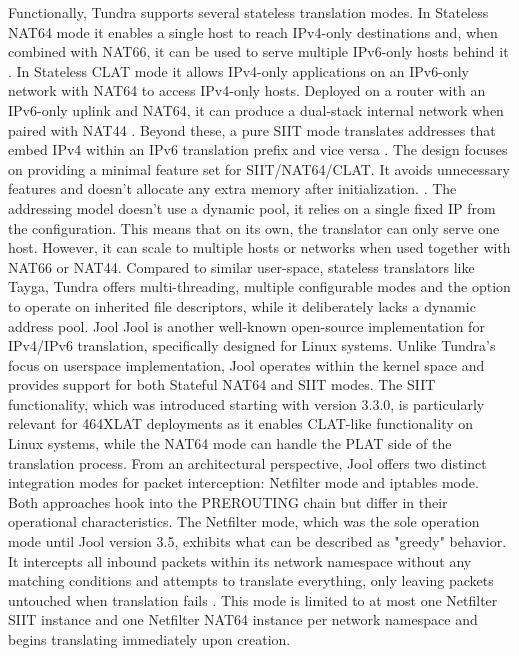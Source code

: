 Functionally, Tundra supports several stateless translation modes. In Stateless NAT64 mode it enables a single host to reach IPv4-only destinations and, when combined with NAT66, it can be used to serve multiple IPv6-only hosts behind it \cite{labuda_tundra_nat64}. In Stateless CLAT mode it allows IPv4-only applications on an IPv6-only network with NAT64 to access IPv4-only hosts. Deployed on a router with an IPv6-only uplink and NAT64, it can produce a dual-stack internal network when paired with NAT44 \cite{labuda_tundra_nat64}. Beyond these, a pure SIIT mode translates addresses that embed IPv4 within an IPv6 translation prefix and vice versa \cite{labuda_tundra_nat64}. 
The design focuses on providing a minimal feature set for SIIT/NAT64/CLAT. It avoids unnecessary features and doesn’t allocate any extra memory after initialization. \cite{labuda_tundra_nat64}. The addressing model doesn’t use a dynamic pool, it relies on a single fixed IP from the configuration. This means that on its own, the translator can only serve one host. However, it can scale to multiple hosts or networks when used together with NAT66 or NAT44\cite{labuda_tundra_nat64}.
Compared to similar user-space, stateless translators like Tayga, Tundra offers multi-threading, multiple configurable modes and the option to operate on inherited file descriptors, while it deliberately lacks a dynamic address pool\cite{labuda_tundra_nat64}. 
Jool
Jool is another well-known open-source implementation for IPv4/IPv6 translation, specifically designed for Linux systems\cite{jool_introduction}. Unlike Tundra's focus on userspace implementation, Jool operates within the kernel space and provides support for both Stateful NAT64 and SIIT modes. The SIIT functionality, which was introduced starting with version 3.3.0, is particularly relevant for 464XLAT deployments as it enables CLAT-like functionality on Linux systems, while the NAT64 mode can handle the PLAT side of the translation process\cite{jool_introduction}.
From an architectural perspective, Jool offers two distinct integration modes for packet interception: Netfilter mode and iptables mode. Both approaches hook into the PREROUTING chain but differ in their operational characteristics\cite{jool_introduction}. The Netfilter mode, which was the sole operation mode until Jool version 3.5, exhibits what can be described as "greedy" behavior. It intercepts all inbound packets within its network namespace without any matching conditions and attempts to translate everything, only leaving packets untouched when translation fails \cite{jool_introduction}. This mode is limited to at most one Netfilter SIIT instance and one Netfilter NAT64 instance per network namespace and begins translating immediately upon creation.
